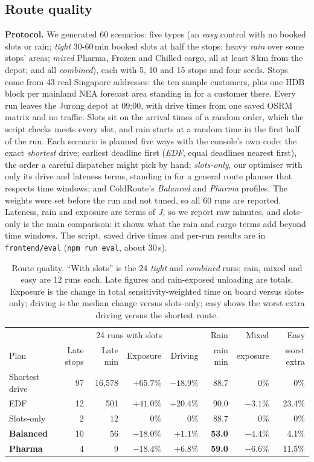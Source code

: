 \documentclass[10.5pt,a4paper]{article}
\begin{document}
\subsection{Route quality}\label{sec:quality}
\textbf{Protocol.} We generated 60 scenarios: five types (an \emph{easy} control with no booked slots or rain; \emph{tight}
30-60\,min booked slots at half the stops; heavy \emph{rain} over some stops' areas; \emph{mixed} Pharma, Frozen and Chilled
cargo, all at least 8\,km from the depot; and all \emph{combined}), each with 5, 10 and 15 stops and four seeds. Stops come
from 43 real Singapore addresses: the ten sample customers, plus one HDB block per mainland NEA forecast area standing in
for a customer there. Every run leaves the Jurong depot at 09:00, with drive times from one saved OSRM matrix and no traffic.
Slots sit on the arrival times of a random order, which the script checks meets every slot, and rain starts at a random time
in the first half of the run. Each scenario is planned five ways with the console's own code: the exact \emph{shortest}
drive; earliest deadline first (\emph{EDF}, equal deadlines nearest first), the order a careful dispatcher might pick by hand;
\emph{slots-only}, our optimiser with only its drive and lateness terms, standing in for a general route planner that
respects time windows; and ColdRoute's \emph{Balanced} and \emph{Pharma} profiles. The weights were set before the run and
not tuned, so all 60 runs are reported. Lateness, rain and exposure are terms of $J$, so we report raw minutes, and
slots-only is the main comparison: it shows what the rain and cargo terms add beyond time windows. The script, saved drive
times and per-run results are in \texttt{frontend/eval} (\texttt{npm run eval}, about 30\,s).

\begin{table}[h]
\centering\footnotesize
\setlength{\tabcolsep}{4pt}
\caption{Route quality. ``With slots'' is the 24 \emph{tight} and \emph{combined} runs; rain, mixed and easy are 12 runs each.
Late figures and rain-exposed unloading are totals. Exposure is the change in total sensitivity-weighted time on board versus
slots-only; driving is the median change versus slots-only; easy shows the worst extra driving versus the shortest route.}\label{tab:quality}
\begin{tabular}{@{}l|rrrr|r|r|r@{}}
\toprule
 & \multicolumn{4}{c|}{24 runs with slots} & Rain & Mixed & Easy \\
Plan & Late stops & Late min & Exposure & Driving & rain min & exposure & worst extra \\
\midrule
Shortest drive & 97 & 16,578 & $+65.7\%$ & $-18.9\%$ & 88.7 & 0\% & 0\% \\
EDF & 12 & 501 & $+41.0\%$ & $+20.4\%$ & 90.0 & $-3.1\%$ & 23.4\% \\
Slots-only & 2 & 12 & 0\% & 0\% & 88.7 & 0\% & 0\% \\
\textbf{Balanced} & 10 & 56 & $\mathbf{-18.0\%}$ & $+1.1\%$ & \textbf{53.0} & $-4.4\%$ & 4.1\% \\
\textbf{Pharma} & 4 & 9 & $\mathbf{-18.4\%}$ & $+6.8\%$ & \textbf{59.0} & $-6.6\%$ & 11.5\% \\
\bottomrule
\end{tabular}
\end{table}
\end{document}
